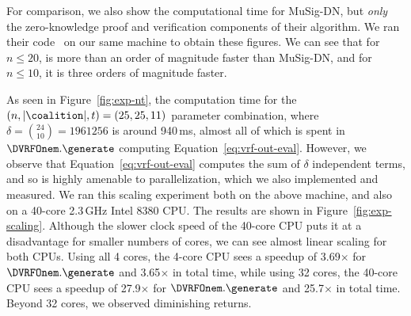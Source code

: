 For comparison, we also show the computational time for MuSig-DN, but
\emph{only} the zero-knowledge proof and verification components of
their algorithm.  We ran their code~\cite{musig-dn-code} on our same
machine to obtain these figures.  We can see that for $n\le 20$,
\glitter is more than an order of magnitude faster than MuSig-DN, and
for $n \le 10$, it is three orders of magnitude faster.

As seen in Figure~\ref{fig:exp-nt}, the computation time for the $(n,|\coalition|,t)
= (25, 25, 11)$ parameter combination, where $\delta = {24 \choose 10} =
1961256$ is around 940\,ms, almost all of which is spent in
$\DVRFOnem.\generate$ computing Equation~\ref{eq:vrf-out-eval}.
However, we observe that Equation~\ref{eq:vrf-out-eval} computes the sum of $\delta$
independent terms, and so is highly amenable to parallelization, which we also implemented and measured.
We ran this scaling experiment both on the above machine, and also on
a 40-core 2.3\,GHz Intel 8380 CPU.  The results are shown in
Figure~\ref{fig:exp-scaling}.  Although the slower clock speed of the
40-core CPU puts it at a disadvantage for smaller numbers of cores,
we can see almost linear scaling for both CPUs.  Using all 4 cores, the
4-core CPU sees a speedup of 3.69$\times$ for $\DVRFOnem.\generate$ and
3.65$\times$ in total time, while using 32 cores, the 40-core CPU sees a
speedup of 27.9$\times$ for $\DVRFOnem.\generate$ and 25.7$\times$ in total time.
Beyond 32 cores, we observed diminishing returns.

